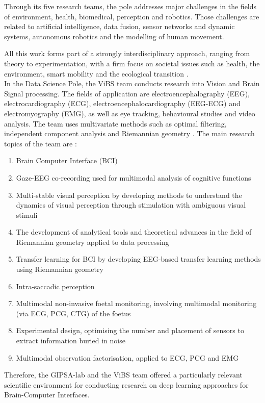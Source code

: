 \documentclass[11pt,a4paper]{article}
\begin{document}
Through its five research teams, the pole addresses major challenges in the fields of environment, health, biomedical, perception and robotics. Those challenges are related to artificial intelligence, data fusion, sensor networks and dynamic systems, autonomous robotics and the modelling of human movement.

All this work forms part of a strongly interdisciplinary approach, ranging from theory to experimentation, with a firm focus on societal issues such as health, the environment, smart mobility and the ecological transition \cite{gipsa_psd}. \\ 

In the Data Science Pole, the ViBS team conducts research into Vision and Brain Signal processing. The fields of application are electroencephalography (EEG), electrocardiography (ECG), electroencephalocardiography (EEG-ECG) and electromyography (EMG), as well as eye tracking, behavioural studies and video analysis. The team uses multivariate methods such as optimal filtering, independent component analysis and Riemannian geometry \cite{gipsa_vibs}.
The main research topics of the team are :
\begin{enumerate}
    \item Brain Computer Interface (BCI)
    \item Gaze-EEG co-recording used for multimodal analysis of cognitive functions
    \item Multi-stable visual perception by developing methods to understand the dynamics of visual perception through stimulation with ambiguous visual stimuli
    \item The development of analytical tools and theoretical advances in the field of Riemannian geometry applied to data processing
    \item Transfer learning for BCI by developing EEG-based transfer learning methods using Riemannian geometry
    \item Intra-saccadic perception
    \item Multimodal non-invasive foetal monitoring, involving multimodal monitoring (via ECG, PCG, CTG) of the foetus
    \item Experimental design, optimising the number and placement of sensors to extract information buried in noise
    \item Multimodal observation factorisation, applied to ECG, PCG and EMG
\end{enumerate}

Therefore, the GIPSA-lab and the ViBS team offered a particularly relevant scientific environment for conducting research on deep learning approaches for Brain-Computer Interfaces.
\end{document}
